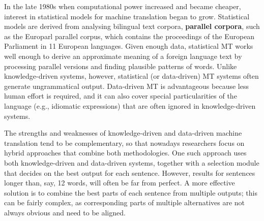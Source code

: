 \documentclass[]{../../metanetpaper}
\begin{document}
\begin{Parallel}[c]{79mm}{78mm}
{    In the late 1980s when computational power increased and became cheaper, interest in statistical models for machine translation began to grow. Statistical models are derived from analysing bilingual text corpora, \textbf{parallel corpora}, such as the Europarl parallel corpus, which contains the proceedings of the European Parliament in 11 European languages. Given enough data, statistical MT works well enough to derive an approximate meaning of a foreign language text by processing parallel versions and finding plausible patterns of words. Unlike knowledge-driven systems, however, statistical (or data-driven) MT systems often generate ungrammatical output. Data-driven MT is advantageous because less human effort is required, and it can also cover special particularities of the language (e.g., idiomatic expressions) that are often ignored in knowledge-driven systems. 

    The strengths and weaknesses of knowledge-driven and data-driven machine translation tend to be complementary, so that nowadays researchers focus on hybrid approaches that combine both methodologies. One such approach uses both knowledge-driven and data-driven systems, together with a selection module that decides on the best output for each sentence. However, results for sentences longer than, say, 12 words, will often be far from perfect. A more effective solution is to combine the best parts of each sentence from multiple outputs; this can be fairly complex, as corresponding parts of multiple alternatives are not always obvious and need to be aligned. 

}
\end{Parallel}
\end{document}
